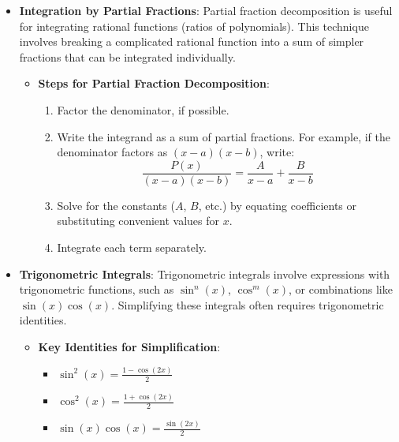 \begin{itemize}
\item \textbf{Integration by Partial Fractions}: 
Partial fraction decomposition is useful for integrating rational functions (ratios of polynomials). This technique involves breaking a complicated rational function into a sum of simpler fractions that can be integrated individually.

    \begin{itemize}
    \item \textbf{Steps for Partial Fraction Decomposition}:
        \begin{enumerate}
        \item Factor the denominator, if possible.
        \item Write the integrand as a sum of partial fractions. For example, if the denominator factors as \( (x - a)(x - b) \), write:
            \[
            \frac{P(x)}{(x - a)(x - b)} = \frac{A}{x - a} + \frac{B}{x - b}
            \]
        \item Solve for the constants (\( A \), \( B \), etc.) by equating coefficients or substituting convenient values for \( x \).
        \item Integrate each term separately.
        \end{enumerate}


    \end{itemize}

\item \textbf{Trigonometric Integrals}: 
Trigonometric integrals involve expressions with trigonometric functions, such as \( \sin^n(x) \), \( \cos^m(x) \), or combinations like \( \sin(x) \cos(x) \). Simplifying these integrals often requires trigonometric identities.

    \begin{itemize}
    \item \textbf{Key Identities for Simplification}:
        \begin{itemize}
        \item \( \sin^2(x) = \frac{1 - \cos(2x)}{2} \)
        \item \( \cos^2(x) = \frac{1 + \cos(2x)}{2} \)
        \item \( \sin(x)\cos(x) = \frac{\sin(2x)}{2} \)
        \end{itemize}

    \end{itemize}


\end{itemize}
